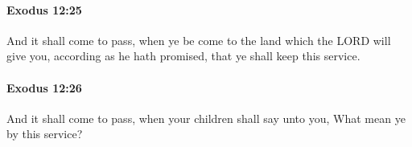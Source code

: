 		\paragraph{Exodus 12:25} %
			\label{EXODUS-12-25}

			And it shall come to pass, when ye be come to the land which the LORD will give you, according as he hath promised, that ye shall keep this service.


		\paragraph{Exodus 12:26} %
			\label{EXODUS-12-26}

			And it shall come to pass, when your children shall say unto you, What mean ye by this service?


